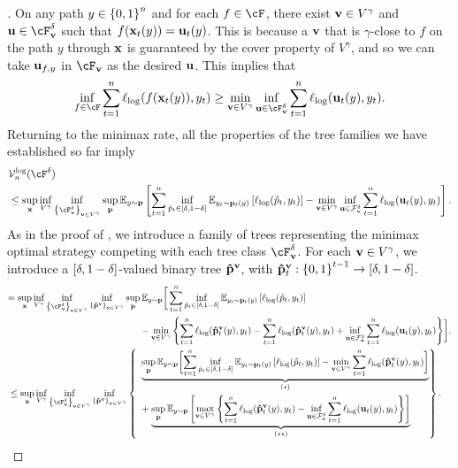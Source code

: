 \begin{proof}[]
On any path $y \in \zo^n$ and for each $f \in \F$, there exist $\vv \in V^\gamma$ and $\uu \in \F_\vv^{\delta}$ such that $f(\x_t(y)) = \uu_{t}(y)$. This is because a $\vv$ that is $\gamma$-close to $f$ on the path $y$ through $\x$ is guaranteed by the cover property of $V^{\gamma}$, and so we can take $\uu_{f,y}$ in $\cF_{\vv}$ as the desired $\uu$. This implies that
$$
\inf_{f \in \F }\sum_{t=1}^n \logloss(f(\x_t(y)),y_t) \ge \min_{\vv \in V^\gamma} \inf_{\uu \in \F_\vv^{\delta} }\sum_{t=1}^n \logloss(\uu_t(y),y_t).
$$
Returning to the minimax rate, all the properties of the tree families we have established so far imply
\begin{align}
\notag & \mathcal{V}^{\mathrm{log}}_n(\F^{\delta})  \\ & \le \sup_{\x}\inf_{V^{\gamma}}\inf_{\crl*{\cF_{\vv}^{\delta}}_{\vv\in{}V^{\gamma}}}\sup_{\p}\mathbb{E}_{y \sim \p}\left[ \sum_{t=1}^n \inf_{\lpred_t\in\brk*{\delta, 1-\delta}} \mathbb{E}_{y_t \sim \p_t(y)}\left[\logloss(\lpred_t,y_t)\right] - \min_{\vv \in V^\gamma} \inf_{\uu \in \mathcal{F}_\vv^{\delta}} \sum_{t=1}^n \logloss(\uu_t(y),y_t)\right]. \notag
\end{align}
As in the proof of , we introduce a family of trees representing the minimax optimal strategy competing with each tree class $\cF_{\vv}^{\delta}$. For each $\vv\in{}V^{\gamma}$, we introduce a $\brk*{\delta, 1-\delta}$-valued binary tree $\phtree^{\vv}$, with $\phtree^{\vv}_{t}:\zo^{t-1}\to\deltarange$.
{\small
\begin{align}
  & \begin{aligned}= \sup_{\x}\inf_{V^{\gamma}}\inf_{\crl*{\cF_{\vv}^{\delta}}_{\vv\in{}V^{\gamma}}}\inf_{\crl*{\phtree^{\vv}}_{\vv\in{}V^{\gamma}}}\sup_{\p} \mathbb{E}_{y \sim \p}\biggl[& \sum_{t=1}^n \inf_{\hat{p}_t\in\deltarange} \mathbb{E}_{y_t \sim \p_t(y)}\left[\logloss(\hat{p}_t,y_t)\right] \\
    &\hspace{-3em}- \min_{\vv \in V^\gamma}\left\{ \sum_{t=1}^n \logloss(\phtree_t^\vv(y),y_t) - \sum_{t=1}^n \logloss(\phtree_t^\vv(y),y_t) +  \inf_{\uu \in \mathcal{F}_\vv^{\delta}} \sum_{t=1}^n \logloss(\uu_t(y),y_t)\right\}\biggr].\end{aligned} \notag \\
& \leq\sup_{\x}\inf_{V^{\gamma}}\inf_{\crl*{\cF_{\vv}^{\delta}}_{\vv\in{}V^{\gamma}}}\inf_{\crl*{\phtree^{\vv}}_{\vv\in{}V^{\gamma}}}\left\{\begin{aligned}~& \underbrace{\sup_{\p} \mathbb{E}_{y \sim \p}\biggl[ \sum_{t=1}^n \inf_{\hat{p}_t\in\deltarange} \mathbb{E}_{y_t \sim \p_t(y)}\left[\logloss(\hat{p}_t,y_t)\right] - \min_{\vv \in V^\gamma}\sum_{t=1}^n \logloss(\phtree_t^\vv(y),y_t)\biggr]}_{(\star)} \\
  & + \underbrace{\sup_{\p}\mathbb{E}_{y \sim \p}\left[ \max_{\vv \in V^\gamma}\left\{ \sum_{t=1}^n \logloss(\phtree_t^\vv(y),y_t) -  \inf_{\uu \in \mathcal{F}_\vv^{\delta}} \sum_{t=1}^n \logloss(\uu_t(y),y_t)\right\}\right]}_{(\star\star)}
  \end{aligned}\right\}.\label{eq:star_logloss}
\end{align}}


\end{proof}
